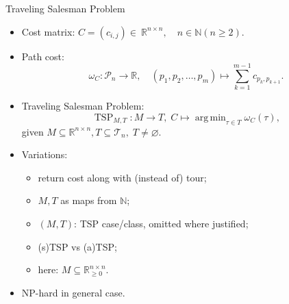 \documentclass[
  size=8pt,
  style=klope,
  paper=screen,
  pauseslide,
  nopagebreaks,
  hlsections,
  fleqn
]{powerdot}
\DeclareMathOperator*{\argmin}{arg\,min}
\def\eqitspace{\vspace{-5mm}}
\begin{document}
\begin{slide}{Traveling Salesman Problem}
\begin{itemize}
  \item
  Cost matrix: $C = \left(c_{i,j}\right) \in~\mathbb{R}^{n \times n},
    \quad n \in \mathbb{N} \left(n \geq 2\right)$.
  \item
  Path cost:
  \vspace{-2mm}
  \begin{equation}
    \omega_C: \mathcal{P}_n \to \mathbb{R}, \quad
    \left(p_1,p_2,\ldots,p_m\right) \mapsto \sum_{k=1}^{m-1} c_{p_k,p_{k+1}}.
  \end{equation}
  \eqitspace%
  \item
  Traveling Salesman Problem:
  \begin{equation}
    \operatorname{TSP}_{M,T} : M \to T, \; C \mapsto \argmin_{\tau \in T} \omega_C\left(\tau\right),
  \end{equation}
  given $M \subseteq \mathbb{R}^{n \times n}, T \subseteq \mathcal{T}_n, \; T \neq \varnothing$.
  \item
  Variations:
  \begin{itemize}
  \item return cost along with (instead of) tour;
  \item $M, T$ as maps from $\mathbb{N}$;
  \item $(M, T)$: TSP case/class, omitted where justified;
  \item (s)TSP vs (a)TSP\@;
  \item here: $M \subseteq \mathbb{R}^{n \times n}_{\geq 0}$.
  \end{itemize}
  \vspace{-2mm}
  \item
  NP-hard in general case.
\end{itemize}
\end{slide}
\end{document}
